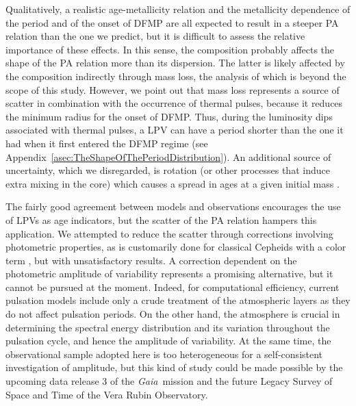 \documentclass[letter]{aa}
\newcommand{\gaia}{\textit{Gaia}}
\begin{document}
Qualitatively, a realistic age-metallicity relation and the metallicity dependence of the period and of the onset of DFMP are all expected to result in a steeper PA relation than the one we predict, but it is difficult to assess the relative importance of these effects.
In this sense, the composition probably affects the shape of the PA relation more than its dispersion. The latter is likely affected by the composition indirectly through mass loss, the analysis of which is beyond the scope of this study.
However, we point out that mass loss represents a source of scatter in combination with the occurrence of thermal pulses, because it reduces the minimum radius for the onset of DFMP. Thus, during the luminosity dips associated with thermal pulses, a LPV can have a period shorter than the one it had when it first entered the DFMP regime (see Appendix~\ref{asec:TheShapeOfThePeriodDistribution}). An additional source of uncertainty, which we disregarded, is rotation (or other processes that induce extra mixing in the core) which causes a spread in ages at a given initial mass \citep[cf.][for the case of classical Cepheids]{Anderson_etal_2016}.

The fairly good agreement between models and observations encourages the use of LPVs as age indicators, but the scatter of the PA relation hampers this application. We attempted to reduce the scatter through corrections involving photometric properties, as is customarily done for classical Cepheids with a color term \citep[e.g.,][]{Bono_etal_2005}, but with unsatisfactory results. A correction dependent on the photometric amplitude of variability represents a promising alternative, but it cannot be pursued at the moment. Indeed, for computational efficiency, current pulsation models include only a crude treatment of the atmospheric layers as they do not affect pulsation periods. On the other hand, the atmosphere is crucial in determining the spectral energy distribution and its variation throughout the pulsation cycle, and hence the amplitude of variability. At the same time, the observational sample adopted here is too heterogeneous for a self-consistent investigation of amplitude, but this kind of study could be made possible by the upcoming data release 3 of the \gaia\ mission \citep{GaiaCollaboration_2021_EDR3} and the future Legacy Survey of Space and Time \citep[LSST,][]{Ivezic_LSST_2019} of the Vera Rubin Observatory.
\end{document}
